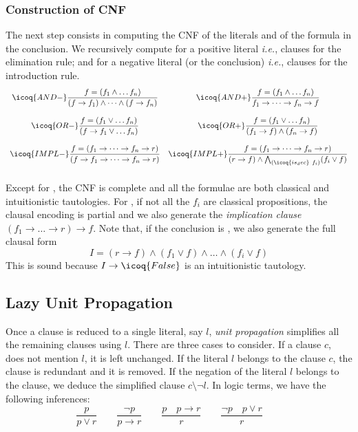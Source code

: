 \documentclass[utf8,a4paper,UKenglish,cleveref, autoref, thm-restate]{lipics-v2019}
\begin{document}
\subsubsection{Construction of CNF}
The next step consists in computing the CNF of the literals and of the
formula in the conclusion.  We recursively compute for a positive literal
 \emph{i.e.}, clauses for the elimination rule; and for a
negative literal (or the conclusion)  \emph{i.e.}, clauses
for the introduction rule.
\[
  \begin{array}{cc}
  \icoq{AND-} \dfrac{ f = (f_1 \land \dots f_n) }
  { (f \to f_1) \land \dots \land (f \to f_n) } &
    \icoq{AND+} \dfrac{ f = (f_1 \land \dots f_n) }
    { f_1 \to \dots \to f_n \to f } \\\\
    \icoq{OR-}  \dfrac{ f = (f_1 \lor \dots f_n) }
    { (f \to f_1 \lor \dots f_n) } &
    \icoq{OR+}  \dfrac{ f = (f_1 \lor \dots f_n) }
    { (f_1 \to  f) \land  (f_n \to f) }\\\\
    \icoq{IMPL-}  \dfrac{ f = (f_1 \to \dots \to f_n \to r) }
                   { (f \to f_1 \to \dots \to f_n \to r) } &
    \icoq{IMPL+}  \dfrac{ f = (f_1 \to \dots \to f_n \to r) }
                   { (r \to f) \land \bigwedge_{(\icoq{is_dec}\ f_i)} (f_i \lor f)   }\\\\
  \end{array}
\]
Except for , the CNF is complete and all the formulae are
both classical and intuitionistic tautologies.
%
For , if not all the $f_i$ are classical propositions, the
clausal encoding is partial and we also generate the \emph{implication
  clause} $(f_1 \to \dots \to r) \to f$. Note that, if the conclusion
is , we also generate the full clausal form
\[
  I = (r \to f) \land (f_1 \lor f) \land \dots \land (f_i \lor f)
\]
This is sound because $I \to \icoq{False}$ is an intuitionistic tautology.

\subsection{Lazy Unit Propagation}

Once a clause is reduced to a single literal, say $l$, \emph{unit
  propagation} simplifies all the remaining clauses using $l$. There
are three cases to consider.  If a clause $c$, does not mention $l$,
it is left unchanged. If the literal $l$ belongs to the clause $c$,
the clause is redundant and it is removed. If the negation of the
literal $l$ belongs to the clause, we deduce the simplified clause
$c \setminus \neg l$. In logic terms, we have the following inferences:
\[
  \dfrac{ p }{ p \lor r } \qquad
  \dfrac {\neg p }{ p \to r } \qquad 
  \dfrac{p \quad p \to r}
  { r }  \qquad
  \dfrac{\neg p \quad p \lor r}{r} 
  \qquad
\]
\end{document}

